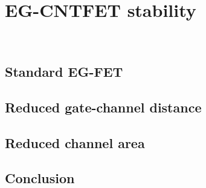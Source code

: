 \chapter{EG-CNTFET stability}
\label{cap:chapter3}



\newpage
\thispagestyle{empty}
\ %
\newpage


\section{Standard EG-FET}
\label{sec:big_channel}




\section{Reduced gate-channel distance}
\label{sec:small_distance}




\section{Reduced channel area}
\label{sec:small_channel}




\section{Conclusion}
\label{sec:stability_conclusion}




\newpage
\thispagestyle{empty}
\ %
\newpage
